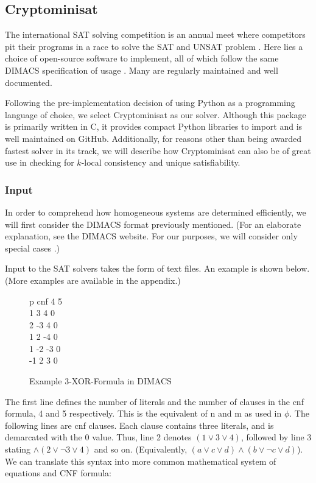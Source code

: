 \subsection{Cryptominisat}
The international SAT solving competition is an annual meet where competitors pit their programs in a race to solve the SAT and UNSAT problem \cite{sat_competitions_2017}. Here lies a choice of open-source software to implement, all of which follow the same DIMACS specification of usage \cite{dimacs_2017}. Many are regularly maintained and well documented.
\par
Following the pre-implementation decision of using Python as a programming language of choice, we select Cryptominisat as our solver. Although this package is primarily written in C, it provides compact Python libraries to import and is well maintained on GitHub. Additionally, for reasons other than being awarded fastest solver in its track, we will describe how Cryptominisat can also be of great use in checking for $k$-local consistency and unique satisfiability.

\subsubsection{Input}
In order to comprehend how homogeneous systems are determined efficiently, we will first consider the DIMACS format previously mentioned. (For an elaborate explanation, see the DIMACS website. For our purposes, we will consider only special cases \cite{dimacs_2017}.)
\par
Input to the SAT solvers takes the form of text files. An example is shown below. (More examples are available in the appendix.)
\begin{figure}[htbp!]
	\captionsetup{justification=justified, singlelinecheck=false}
	p cnf 4 5 \\
	1 3 4 0 \\
	2 -3 4 0 \\
	1 2 -4 0 \\
	1 -2 -3 0 \\
	-1 2 3 0 \\
	\caption{Example 3-XOR-Formula in DIMACS}
\end{figure}
\par
The first line defines the number of literals and the number of clauses in the cnf formula, 4 and 5 respectively. This is the equivalent of n and m as used in $\phi$. The following lines are cnf clauses. Each clause contains three literals, and is demarcated with the 0 value. Thus, line 2 denotes $(1 \lor 3 \lor 4)$, followed by line 3 stating $\land (2 \lor \lnot3 \lor 4)$ and so on. (Equivalently, $(a \lor c \lor d) \land (b \lor \lnot c \lor d)$). We can translate this syntax into more common mathematical system of equations and CNF formula:

